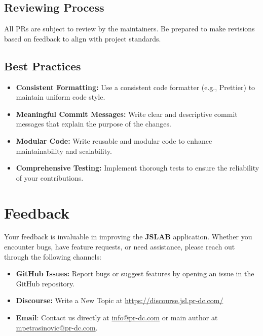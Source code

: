\documentclass[12pt,a4paper]{article}
\begin{document}
\subsection{Reviewing Process}
All PRs are subject to review by the maintainers. Be prepared to make revisions based on feedback to align with project standards.

\subsection{Best Practices}

\begin{itemize}
    \item \textbf{Consistent Formatting:} Use a consistent code formatter (e.g., Prettier) to maintain uniform code style.

    \item \textbf{Meaningful Commit Messages:} Write clear and descriptive commit messages that explain the purpose of the changes.

    \item \textbf{Modular Code:} Write reusable and modular code to enhance maintainability and scalability.

    \item \textbf{Comprehensive Testing:} Implement thorough tests to ensure the reliability of your contributions.
\end{itemize}

\section{Feedback}

Your feedback is invaluable in improving the \textbf{JSLAB} application. Whether you encounter bugs, have feature requests, or need assistance, please reach out through the following channels:

\begin{itemize}
    \item \textbf{GitHub Issues:} Report bugs or suggest features by opening an issue in the GitHub repository.
    \item \textbf{Discourse:} Write a New Topic at \url{https://discourse.jsl.pr-dc.com/}
    \item \textbf{Email}: Contact us directly at \href{mailto:info@pr-dc.com}{info@pr-dc.com} or main author at \href{mailto:mpetrasinovic@pr-dc.com}{mpetrasinovic@pr-dc.com}.
\end{itemize}
\end{document}
